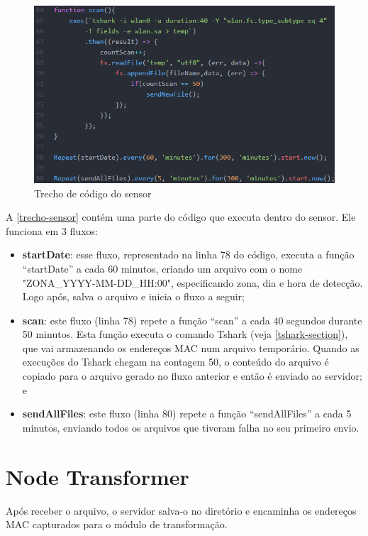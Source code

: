 \begin{figure}[!h]
  \caption{\label{trecho-sensor}Trecho de código do sensor}
  \begin{center}
    \includegraphics[width=1.0\textwidth]{img/sensor.png}
  \end{center}
\end{figure}

A \autoref{trecho-sensor} contém uma parte do código que executa dentro do
sensor. Ele funciona em 3 fluxos:

\begin{itemize}
    \item \textbf{startDate}: esse fluxo, representado na linha 78
    do código, executa a função ``startDate'' a cada 60 minutos, criando um arquivo com
    o nome "ZONA\_YYYY-MM-DD\_HH:00", especificando zona, dia e hora de detecção. Logo
    após, salva o arquivo e inicia o fluxo a seguir;
    \item \textbf{scan}: este fluxo (linha 78) repete a função ``scan'' a cada 40 segundos durante 50 minutos. Esta função executa o
    comando Tshark (veja \autoref{tshark-section}), que vai armazenando os endereços
    MAC num arquivo temporário. Quando as execuções do Tshark chegam na contagem 50,
    o conteúdo do arquivo é copiado para o arquivo gerado no fluxo anterior e então é enviado ao servidor; e
    \item \textbf{sendAllFiles}: este fluxo (linha 80) repete a função ``sendAllFiles'' a cada 5 minutos, enviando todos os arquivos que tiveram falha no seu primeiro envio.
\end{itemize}

\section{Node Transformer}
\label{node-transformer}
Após receber o arquivo, o servidor salva-o no diretório e encaminha os endereços MAC capturados para o
módulo de transformação.

